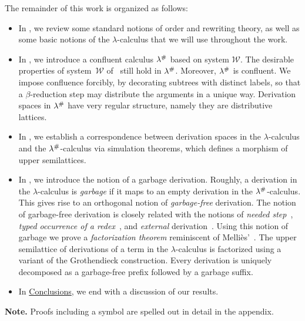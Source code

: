 The remainder of this work is organized as follows:
\begin{itemize}
\item
  In , we review some standard notions of order and rewriting theory, as well as some
  basic notions of the $\lambda$-calculus that we will use throughout the work.
\item
  In , we introduce a confluent calculus $\lambda^{\mathtt{\#}}$ based on system $\mathcal{W}$.
  The desirable properties of system~$\mathcal{W}$ of~\cite{bucciarelli2017non} still hold in $\lambda^{\mathtt{\#}}$.
  Moreover, $\lambda^{\mathtt{\#}}$ is confluent.
  We impose confluence forcibly, by decorating subtrees with distinct labels, so that
  a $\beta$-reduction step may distribute the arguments in a unique way.
  Derivation spaces in $\lambda^{\mathtt{\#}}$ have very regular structure,
  namely they are distributive lattices.
\item
  In , we establish a correspondence between derivation spaces in the
  $\lambda$-calculus and the $\lambda^{\mathtt{\#}}$-calculus via simulation theorems,
  which defines a morphism of upper semilattices.
\item
  In , we introduce the notion of a garbage derivation.
  Roughly, a derivation in the $\lambda$-calculus is {\em garbage} if it maps to
  an empty derivation in the $\lambda^{\mathtt{\#}}$-calculus.
  This gives rise to an orthogonal notion of {\em garbage-free} derivation.
  The notion of garbage-free derivation is closely related
  with the notions of {\em needed step}~\cite[Section~8.6]{Terese},
  {\em typed occurrence of a redex}~\cite{bucciarelli2017non},
  and {\em external} derivation~\cite{DBLP:conf/ctcs/Mellies97}.
  Using this notion of garbage we prove a {\em factorization theorem}
  reminiscent of Melli\`es'~\cite{DBLP:conf/ctcs/Mellies97}.
  The upper semilattice of derivations of a term in the $\lambda$-calculus
  is factorized using a variant of the Grothendieck construction.
  Every derivation is uniquely decomposed as a garbage-free prefix followed by a garbage suffix.
\item
  In \hyperref[ch:conclusions]{Conclusions}, we end with a discussion of our results.
\end{itemize}
\bigskip
{\bf Note.} Proofs including a \SeeAppendix symbol are spelled out in detail in the appendix.
